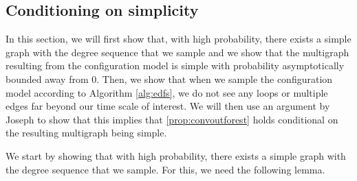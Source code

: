 \subsection{Conditioning on simplicity}
In this section, we will first show that, with high probability, there exists a simple graph with the degree sequence that we sample and we show that the multigraph resulting from the configuration model is simple with probability asymptotically bounded away from $0$. Then, we show that when we sample the configuration model according to Algorithm \ref{alg:edfs}, we do not see any loops or multiple edges far beyond our time scale of interest. We will then use an argument by Joseph \cite{josephComponentSizesCritical2014} to show that this implies that \cref{prop:convoutforest} holds conditional on the resulting multigraph being simple.

We start by showing that with high probability, there exists a simple graph with the degree sequence that we sample. For this, we need the following lemma. 

